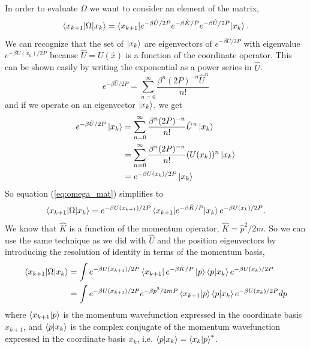 \documentclass{article}
\newcommand{\be}{\begin{equation}}
\newcommand{\ee}{\end{equation}}
\begin{document}
In order to evaluate $\Omega$ we want to consider an element of the matrix,
\be \label{eq:omega_mat}
  \braket{x_{k+1}|\Omega|x_k} = \braket{x_{k+1}|e^{-\beta \hat{U}/2P} e^{-\beta \hat{K}/P} e^{-\beta \hat{U}/2P}|x_k} .
\ee
We can recognize that the set of $\ket{x_k}$ are eigenvectors of $e^{-\beta \hat{U}/2P}$ with eigenvalue $e^{-\beta U(x_k)/2P}$ because $\hat{U} = U(\hat{x})$ is a function of the coordinate operator.\cite{griffiths,shankar}
This can be shown easily by writing the exponential as a power series in $\hat{U}$.
\be
  e^{-\beta \hat{U}/2P} = \sum_{n=0}^{\infty} \frac{\beta^n(2P)^{-n} \hat{U}^n}{n!}
\ee
and if we operate on an eigenvector $\ket{x_k}$, we get
\be
  \begin{split}
    e^{-\beta \hat{U}/2P} \ket{x_k} &= \sum_{n=0}^{\infty} \frac{\beta^n(2P)^{-n}}{n!} \hat{U}^n \ket{x_k} \\
    &= \sum_{n=0}^{\infty} \frac{\beta^n(2P)^{-n}}{n!} (U(x_k))^n \ket{x_k} \\
    &= e^{-\beta U(x_k)/2P} \ket{x_k}
  \end{split}
\ee
So equation (\ref{eq:omega_mat}) simplifies to
\be
  \braket{x_{k+1}|\Omega|x_k} = e^{-\beta U(x_{k+1})/2P} \braket{x_{k+1}|e^{-\beta \hat{K}/P} |x_k} e^{-\beta U(x_k)/2P} .
\ee
We know that $\hat{K}$ is a function of the momentum operator, $\hat{K} = \hat{p}^2/2m$. \cite{griffiths,shankar} So we can use the same technique as we did with $\hat{U}$ and the position eigenvectors by introducing the resolution of identity in terms of the momentum basis,
\be
  \begin{split}
    \braket{x_{k+1}|\Omega|x_k} &= \int e^{-\beta U(x_{k+1})/2P} \bra{x_{k+1}}e^{-\beta \hat{K}/P} \ket{p}\braket{p|x_k} e^{-\beta U(x_k)/2P} \\
    &= \int e^{-\beta U(x_{k+1})/2P} e^{-\beta p^2/2mP} \braket{x_{k+1}|p}\braket{p|x_k} e^{-\beta U(x_k)/2P} dp
  \end{split}
\ee
where $\braket{x_{k+1}|p}$ is the momentum wavefunction expressed in the coordinate basis $x_{k+1}$, and $\braket{p|x_k}$ is the complex conjugate of the momentum wavefunction expressed in the coordinate basis $x_k$, i.e. $\braket{p|x_k} = \braket{x_k|p}^*$.
\end{document}
